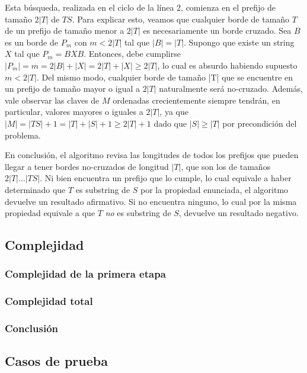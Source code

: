 Esta búsqueda, realizada en el ciclo de la línea 2, comienza en el prefijo de tamaño $2|T|$ de $TS$. Para explicar esto, veamos que cualquier borde de tamaño $T$ de un prefijo de tamaño menor a $2|T|$ es necesariamente un borde cruzado.
\medskip
Sea $B$ es un borde de $P_m$ con $m < 2|T|$ tal que $|B| = |T|$. Supongo que existe un string $X$ tal que $P_m = BXB$. Entonces, debe cumplirse $|P_m| = m = 2|B|+|X| = 2|T| + |X| \geq 2|T|$, lo cual es absurdo habiendo supuesto $m < 2|T|$.
\medskip
Del mismo modo, cualquier borde de tamaño |T| que se encuentre en un prefijo de tamaño mayor o igual a $2|T|$ naturalmente será no-cruzado. Además, vale observar las claves de $M$ ordenadas crecientemente siempre tendrán, en particular, valores mayores o iguales a $2|T|$, ya que $|M| = |TS|+1 = |T|+|S|+1 \geq 2|T| + 1$ dado que $|S| \geq |T|$ por precondición del problema.

En conclusión, el algoritmo revisa las longitudes de todos los prefijos que pueden llegar a tener bordes no-cruzados de longitud $|T|$, que son los de tamaños $2|T| \dots |TS|$. Ni bien encuentra un prefijo que lo cumple, lo cual equivale a haber determinado que $T$ es substring de $S$ por la propiedad enunciada, el algoritmo devuelve un resultado afirmativo. Si no encuentra ninguno, lo cual por la misma propiedad equivale a que $T$ \textit{no} es substring de $S$, devuelve un resultado negativo.
 
\subsection{Complejidad}

\subsubsection{Complejidad de la primera etapa}
\subsubsection{Complejidad total}
\subsubsection{Conclusión}

\subsection{Casos de prueba}